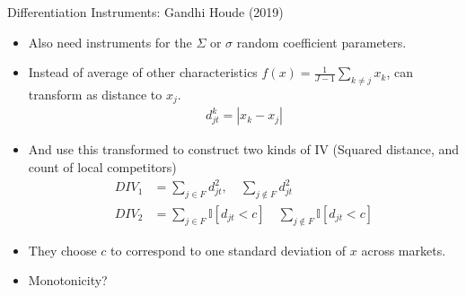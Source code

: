 \begin{frame}{Differentiation Instruments: Gandhi Houde (2019)}
\begin{itemize}
\item Also need instruments for the $\Sigma$ or $\sigma$ random coefficient parameters.
\item Instead of average of other characteristics $f(x) = \frac{1}{J-1} \sum_{k \neq j} x_k$, can transform as distance to $x_j$.
\begin{align*}
d_{jt} ^k=  |x_k - x_j |
\end{align*}
\item And use this transformed to construct two kinds of IV (Squared distance, and count of local competitors)
\begin{align*}
DIV_1 &= \sum_{j \in F}  d_{jt}^2,  \quad  \sum_{j \notin F}  d_{jt}^2 \\
DIV_2 &= \sum_{j \in F}  \mathbb{I}[d_{jt} < c]   \quad \sum_{j \notin F}   \mathbb{I}[d_{jt} < c]
\end{align*}
\item They choose $c$ to correspond to one standard deviation of $x$ across markets.
\item Monotonicity?
\end{itemize}
\end{frame}




